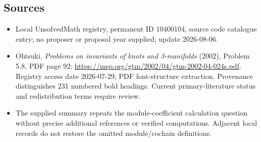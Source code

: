 \documentclass[11pt]{article}
\begin{document}
\subsection{Sources}
\begin{itemize}
\item Local UnsolvedMath registry, permanent ID 10400104, source code catalogue entry; no proposer or proposal year supplied; update 2026-08-06.
\item Ohtsuki, \emph{Problems on invariants of knots and 3-manifolds} (2002), Problem 5.8, PDF page 92: \url{https://msp.org/gtm/2002/04/gtm-2002-04-024s.pdf}. Registry access date 2026-07-29; PDF font-structure extraction. Provenance distinguishes 231 numbered bold headings. Current primary-literature status and redistribution terms require review.
\item The supplied summary repeats the module-coefficient calculation question without precise additional references or verified computations. Adjacent local records do not restore the omitted module/cochain definitions.
\end{itemize}
\end{document}
